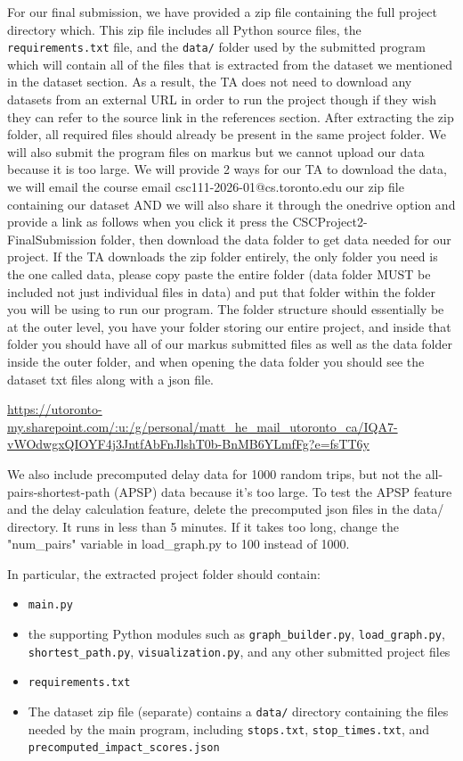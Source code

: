 \documentclass[fontsize=11pt]{article}
\begin{document}
For our final submission, we have provided a zip file containing the full project directory which. This zip file includes all Python source files, the \texttt{requirements.txt} file, and the \texttt{data/} folder used by the submitted program which will contain all of the files that is extracted from the dataset we mentioned in the dataset section. As a result, the TA does not need to download any datasets from an external URL in order to run the project though if they wish they can refer to the source link in the references section. After extracting the zip folder, all required files should already be present in the same project folder. We will also submit the program files on markus but we cannot upload our data because it is too large. We will provide 2 ways for our TA to download the data, we will email the course email csc111-2026-01@cs.toronto.edu our zip file containing our dataset AND we will also share it through the onedrive option and provide a link as follows when you click it press the CSCProject2-FinalSubmission folder, then download the data folder to get data needed for our project. If the TA downloads the zip folder entirely, the only folder you need is the one called data, please copy paste the entire folder (data folder MUST be included not just individual files in data) and put that folder within the folder you will be using to run our program. The folder structure should essentially be at the outer level, you have your folder storing our entire project, and inside that folder you should have all of our markus submitted files as well as the data folder inside the outer folder, and when opening the data folder you should see the dataset txt files along with a json file.

\url{https://utoronto-my.sharepoint.com/:u:/g/personal/matt_he_mail_utoronto_ca/IQA7-vWOdwgxQIOYF4j3JntfAbFnJlshT0b-BnMB6YLmfFg?e=fsTT6y} \newline

We also include precomputed delay data for 1000 random trips, but not the all-pairs-shortest-path (APSP) data because it's too large. To test the APSP feature and the delay calculation feature, delete the precomputed json files in the data/ directory. It runs in less than 5 minutes. If it takes too long, change the "num\_pairs" variable in load\_graph.py to 100 instead of 1000.

\vspace{1em}

In particular, the extracted project folder should contain:
\begin{itemize}
    \item \texttt{main.py}
    \item the supporting Python modules such as \texttt{graph\_builder.py}, \texttt{load\_graph.py}, \texttt{shortest\_path.py}, \texttt{visualization.py}, and any other submitted project files
    \item \texttt{requirements.txt}
    \item The dataset zip file (separate) contains a \texttt{data/} directory containing the files needed by the main program, including \texttt{stops.txt}, \texttt{stop\_times.txt}, and \texttt{precomputed\_impact\_scores.json}
\end{itemize}
\end{document}
